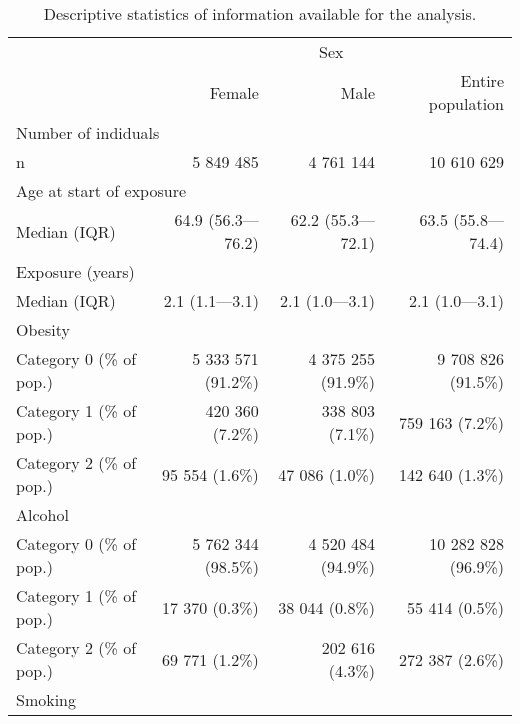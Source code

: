 \documentclass{article}
\begin{document}
\begin{table}\begin{longtable}{l|rrr}
\caption{
\label{tab:demo_stats}Descriptive statistics of information
        available for the analysis.
} \\ 
\toprule
\multicolumn{1}{l}{} & \multicolumn{3}{c}{Sex} \\ 
\cmidrule(lr){2-4}
\multicolumn{1}{l}{} & Female & Male & Entire population \\ 
\midrule
\multicolumn{4}{l}{Number of indiduals} \\ 
\midrule
\hspace*{25px} n & 5 849 485 & 4 761 144 & 10 610 629 \\ 
\midrule
\multicolumn{4}{l}{Age at start of exposure} \\ 
\midrule
\hspace*{25px} Median (IQR) & 64.9 (56.3—76.2) & 62.2 (55.3—72.1) & 63.5 (55.8—74.4) \\ 
\midrule
\multicolumn{4}{l}{Exposure (years)} \\ 
\midrule
\hspace*{25px} Median (IQR) & 2.1 (1.1—3.1) & 2.1 (1.0—3.1) & 2.1 (1.0—3.1) \\ 
\midrule
\multicolumn{4}{l}{Obesity} \\ 
\midrule
\hspace*{25px} Category  0 (\% of pop.) & 5 333 571 (91.2\%) & 4 375 255 (91.9\%) & 9 708 826 (91.5\%) \\ 
\hspace*{25px} Category  1 (\% of pop.) & 420 360 (7.2\%) & 338 803 (7.1\%) & 759 163 (7.2\%) \\ 
\hspace*{25px} Category  2 (\% of pop.) & 95 554 (1.6\%) & 47 086 (1.0\%) & 142 640 (1.3\%) \\ 
\midrule
\multicolumn{4}{l}{Alcohol} \\ 
\midrule
\hspace*{25px} Category  0 (\% of pop.) & 5 762 344 (98.5\%) & 4 520 484 (94.9\%) & 10 282 828 (96.9\%) \\ 
\hspace*{25px} Category  1 (\% of pop.) & 17 370 (0.3\%) & 38 044 (0.8\%) & 55 414 (0.5\%) \\ 
\hspace*{25px} Category  2 (\% of pop.) & 69 771 (1.2\%) & 202 616 (4.3\%) & 272 387 (2.6\%) \\ 
\midrule
\multicolumn{4}{l}{Smoking} \\ 

\end{longtable}
\end{table}
\end{document}

